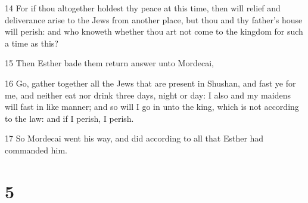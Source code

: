\par 14 For if thou altogether holdest thy peace at this time, then will relief and deliverance arise to the Jews from another place, but thou and thy father's house will perish: and who knoweth whether thou art not come to the kingdom for such a time as this?
\par 15 Then Esther bade them return answer unto Mordecai,
\par 16 Go, gather together all the Jews that are present in Shushan, and fast ye for me, and neither eat nor drink three days, night or day: I also and my maidens will fast in like manner; and so will I go in unto the king, which is not according to the law: and if I perish, I perish.
\par 17 So Mordecai went his way, and did according to all that Esther had commanded him.

\chapter{5}

